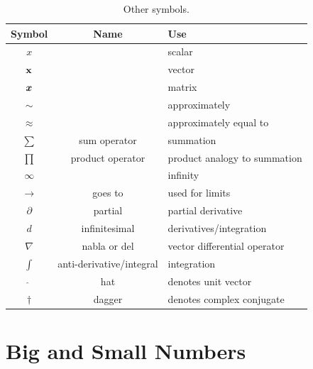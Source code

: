 \begin{table}[hbt]
    \centering
    \caption{Other symbols.\vspace{2pt}}
    \label{tab:symbols}
    \begin{tabular}{@{}ccl@{}}
        \toprule
        \textbf{Symbol} & \textbf{Name} & \textbf{Use} \\
        \midrule
        $x$ & {} & scalar \\
        $\vb{x}$ & {} & vector\\
        $\bm{x}$ & {} & matrix \\
        $\sim$ & {} & approximately \\
        $\approx$ & {} & approximately equal to \\
        $\sum$ & sum operator & summation \\
        $\prod$ & product operator & product analogy to summation \\
        $\infty$ & {} & infinity \\
        $\to$ & goes to & used for limits \\
        $\partial$ & partial & partial derivative \\
        $d$ & infinitesimal & derivatives/integration \\
        $\nabla$ & nabla or del & vector differential operator \\
        $\int$ & anti-derivative/integral & integration \\
        $\hat{}$ & hat & denotes unit vector \\
        $\dagger$ & dagger & denotes complex conjugate \\
        \bottomrule
    \end{tabular}
\end{table}

\section{Big and Small Numbers}

